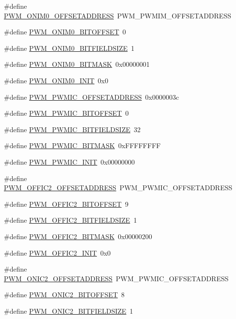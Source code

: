 \begin{DoxyCompactItemize}
\item 
\#define \hyperlink{a00565_ababcd59a5db5295a3854b983e91e1032}{PWM\_\-ONIM0\_\-OFFSETADDRESS}~PWM\_\-PWMIM\_\-OFFSETADDRESS
\item 
\#define \hyperlink{a00565_a119f48c42261b5ebca8415edb1c122b0}{PWM\_\-ONIM0\_\-BITOFFSET}~0
\item 
\#define \hyperlink{a00565_ae7eca55b2c1528595f07d571376f2044}{PWM\_\-ONIM0\_\-BITFIELDSIZE}~1
\item 
\#define \hyperlink{a00565_a03867e034567918d31ffaf38512c7556}{PWM\_\-ONIM0\_\-BITMASK}~0x00000001
\item 
\#define \hyperlink{a00565_aaf81938645250f5383f7dd5d429d4981}{PWM\_\-ONIM0\_\-INIT}~0x0
\item 
\#define \hyperlink{a00565_a4ed506b6b0291be53741bd7a9ced73a5}{PWM\_\-PWMIC\_\-OFFSETADDRESS}~0x0000003c
\item 
\#define \hyperlink{a00565_a8bb11f7bed8dc0591fdf4026a9380dbd}{PWM\_\-PWMIC\_\-BITOFFSET}~0
\item 
\#define \hyperlink{a00565_a7d313f8bac74b3afd862d383ce57df50}{PWM\_\-PWMIC\_\-BITFIELDSIZE}~32
\item 
\#define \hyperlink{a00565_ac6be16b81228d8e168d46269385fab6d}{PWM\_\-PWMIC\_\-BITMASK}~0xFFFFFFFF
\item 
\#define \hyperlink{a00565_a0464f8f18a320328dd7a2e100de3c367}{PWM\_\-PWMIC\_\-INIT}~0x00000000
\item 
\#define \hyperlink{a00565_a4442dd1a7a9bb9bbb94778f3dd6463bd}{PWM\_\-OFFIC2\_\-OFFSETADDRESS}~PWM\_\-PWMIC\_\-OFFSETADDRESS
\item 
\#define \hyperlink{a00565_a257b9ca27dfc054f60faf59d9edac1a7}{PWM\_\-OFFIC2\_\-BITOFFSET}~9
\item 
\#define \hyperlink{a00565_ac5e73d679bc421137b94da4c343ce3c8}{PWM\_\-OFFIC2\_\-BITFIELDSIZE}~1
\item 
\#define \hyperlink{a00565_abe54248326e414e6b9152ae2b196f4e4}{PWM\_\-OFFIC2\_\-BITMASK}~0x00000200
\item 
\#define \hyperlink{a00565_a93b0dc851986b12ea90b737fd896147a}{PWM\_\-OFFIC2\_\-INIT}~0x0
\item 
\#define \hyperlink{a00565_ad974ce25581be8812e9e9ed8f30976d0}{PWM\_\-ONIC2\_\-OFFSETADDRESS}~PWM\_\-PWMIC\_\-OFFSETADDRESS
\item 
\#define \hyperlink{a00565_a47cf9ee8db1a0d2c45deaba2a05e36af}{PWM\_\-ONIC2\_\-BITOFFSET}~8
\item 
\#define \hyperlink{a00565_a9bfa96509dda21eff340370ccedd684b}{PWM\_\-ONIC2\_\-BITFIELDSIZE}~1

\end{DoxyCompactItemize}
